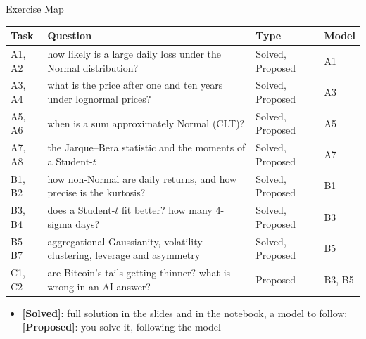 \begin{frame}{Exercise Map}
\itemsize{\small}
\begin{center}
\footnotesize
\begin{tabular}{>{\raggedright\arraybackslash}p{1.0cm}>{\raggedright\arraybackslash}p{7.6cm}>{\raggedright\arraybackslash}p{1.9cm}>{\raggedright\arraybackslash}p{1.4cm}}
\toprule
\textbf{Task} & \textbf{Question} & \textbf{Type} & \textbf{Model} \\
\midrule
A1, A2 & how likely is a large daily loss under the Normal distribution? & Solved, Proposed & A1 \\
A3, A4 & what is the price after one and ten years under lognormal prices? & Solved, Proposed & A3 \\
A5, A6 & when is a sum approximately Normal (CLT)? & Solved, Proposed & A5 \\
A7, A8 & the Jarque--Bera statistic and the moments of a Student-$t$ & Solved, Proposed & A7 \\
B1, B2 & how non-Normal are daily returns, and how precise is the kurtosis? & Solved, Proposed & B1 \\
B3, B4 & does a Student-$t$ fit better? how many 4-sigma days? & Solved, Proposed & B3 \\
B5--B7 & aggregational Gaussianity, volatility clustering, leverage and asymmetry & Solved, Proposed & B5 \\
C1, C2 & are Bitcoin's tails getting thinner? what is wrong in an AI answer? & Proposed & B3, B5 \\
\bottomrule
\end{tabular}
\end{center}
\begin{itemize}
    \item \textbf{[Solved]}: full solution in the slides and in the notebook, a model to follow; \textbf{[Proposed]}: you solve it, following the model
\end{itemize}
\end{frame}

